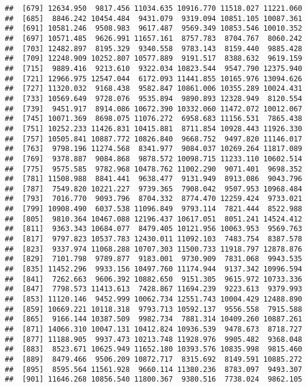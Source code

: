 \documentclass[]{article}
\begin{document}
\begin{verbatim}
##  [679] 12634.950  9817.456 11034.635 10916.770 11518.027 11221.060
##  [685]  8846.242 10454.484  9431.079  9319.094 10851.105 10087.361
##  [691] 10581.246  9508.983  9617.487  9569.349 10853.546 10010.352
##  [697] 10571.485  9626.991 11657.161  8757.783  8704.767  8060.242
##  [703] 12482.897  8195.329  9340.558  9783.143  8159.440  9885.428
##  [709] 12248.909 10252.807 10577.889  9191.517  8388.632  9619.159
##  [715]  9889.416  9213.610  9322.034 10823.544  9547.790 12375.940
##  [721] 12966.975 12547.044  6172.093 11441.855 10165.976 13094.626
##  [727] 11320.032  9168.438  9582.847 10861.006 10355.289 10024.431
##  [733] 10569.649  9728.076  9535.894  9890.893 12328.949  8120.554
##  [739]  9451.917  8914.086 10672.390 10332.060 11472.072 10012.067
##  [745] 10071.369  8698.075 11076.272  6958.683 11156.531  7865.438
##  [751] 10252.233 11426.831 10415.881  8711.854 10928.443 11926.330
##  [757] 10505.841 10887.772 10826.840  9668.752  9497.820 11146.017
##  [763]  9798.196 11274.568  8341.977  9084.037 10269.264 11817.089
##  [769]  9378.887  9084.868  9878.572 10098.715 11233.110 10602.514
##  [775]  9575.585  9782.968 10478.762 11002.290  9071.401  9698.352
##  [781] 11508.988  8841.441  9638.477  9131.949  8913.086  9043.796
##  [787]  7549.820 10221.227  9739.365  7908.042  9507.953 10968.484
##  [793]  7016.770  9093.796  8704.332  8774.470 12259.424  9733.021
##  [799] 10908.490  6037.538 11096.849  9793.114  7821.444  8522.988
##  [805]  9810.364 10467.088 12196.437 10617.051  8051.241 14524.412
##  [811]  9363.343 10684.077  8479.405 10121.956 10063.953  9569.763
##  [817]  9797.823 10537.783 12430.011 11092.103  7483.754  8387.578
##  [823]  9337.974 11068.288 10707.303 11500.733 11918.797 12878.876
##  [829]  7101.798  9789.877  9183.001  9730.909  7831.068  9943.535
##  [835] 11452.296  9933.156 10497.760 11174.944  9137.342 10996.594
##  [841]  7262.663  9606.392 10882.650  9151.305  9615.972 10733.336
##  [847]  7798.573 11413.613  7428.867 11694.239  9223.613  9379.993
##  [853] 11120.146  9452.999 10062.734 12551.743 10004.429 12488.890
##  [859] 10669.221 10118.318  9793.713 10592.137  9556.558  7915.588
##  [865]  9166.144 10387.509  9982.734  7881.314 10409.260 10887.261
##  [871] 14066.310 10047.131 10412.824 10936.539  9478.673  8718.727
##  [877] 11188.905  9937.473 10213.748 11928.976  9905.482  9368.048
##  [883]  8523.671 10625.949 11652.180 10393.576 10835.998  9815.460
##  [889]  8479.466  9506.209 10872.717  8315.692  8149.591 10885.272
##  [895]  8595.564 11561.928  9660.114 11380.236  8783.097  9493.307
##  [901] 11646.268 10856.540 11800.367  9380.516  7738.024  9862.105

\end{verbatim}
\end{document}
